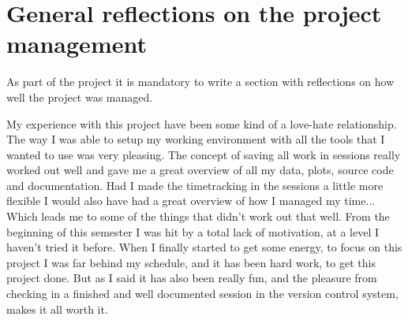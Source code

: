 \section{General reflections on the project management}
As part of the project it is mandatory to write a section with reflections on how well the project was managed. \par

My experience with this project have been some kind of a love-hate relationship. The way I was able to setup my working environment with all the tools that I wanted to use was very pleasing. The concept of saving all work in sessions really worked out well and gave me a great overview of all my data, plots, source code and documentation. Had I made the timetracking in the sessions a little more flexible I would also have had a great overview of how I managed my time...  Which leads me to some of the things that didn't work out that well. From the beginning of this semester I was hit by a total lack of motivation, at a level I haven't tried it before. When I finally started to get some energy, to focus on this project I was far behind my schedule, and it has been hard work, to get this project done. But as I said it has also been really fun, and the pleasure from checking in a finished and well documented session in the version control system, makes it all worth it.


